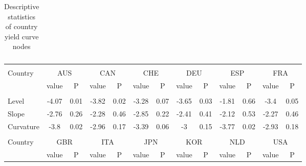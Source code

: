 \documentclass[12pt,bibliography=totoc]{article}
\begin{document}
\begin{appendices}
\begin{table}[H]
\begin{tabular}{l c c c c c c}
\hline%
\end{tabular}
\label{table:nonlin}%
\caption{Descriptive statistics of country yield curve nodes}%
\end{table}

\begin{table}

\fontsize{10}{10}\selectfont
\centering%
\captionsetup{justification=centering}

\begin{subtable}[t]{1\textwidth}
\centering%
\begin{tabular}{l cc cc cc cc cc cc}
\hline\hline \\ [-1.5ex]                         
 

Country	&	\multicolumn{2}{c}{AUS}			&	\multicolumn{2}{c}{CAN}			&	\multicolumn{2}{c}{CHE}			&	\multicolumn{2}{c}{DEU}			&	\multicolumn{2}{c}{ESP}			&	\multicolumn{2}{c}{FRA}			\\[0.5ex] 

& value &P 		& value &P 			& value &P  		& value& P         			& value &P				& value &P\\

\hline       \\ [-1.5ex] 

Level	&	-4.07 & 0.01 & -3.82 & 0.02 & -3.28 & 0.07 & -3.65 & 0.03 & -1.81 & 0.66 & -3.4 & 0.05	\\
Slope	&	-2.76 & 0.26 & -2.28 & 0.46 & -2.85 & 0.22 & -2.41 & 0.41 & -2.12 & 0.53 & -2.27 & 0.46	\\
Curvature	&	-3.8 & 0.02 & -2.96 & 0.17 & -3.39 & 0.06 & -3 & 0.15 & -3.77 & 0.02 & -2.93 & 0.18\\

\hline   \\ [-1.5ex]    

Country	&	\multicolumn{2}{c}{GBR}			&	\multicolumn{2}{c}{ITA}			&	\multicolumn{2}{c}{JPN}			&	\multicolumn{2}{c}{KOR}			&	\multicolumn{2}{c}{NLD}			&	\multicolumn{2}{c}{USA}			\\

 & value &P & value &P& value &P & value &P& value &P & value &P\\


\end{tabular}
\end{subtable}
\end{table}
\end{appendices}
\end{document}

